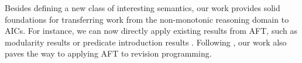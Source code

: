 Besides defining a new class of interesting semantics, our work provides solid foundations for transferring work from the non-monotonic reasoning domain to AICs. For instance, we can now directly apply existing results from AFT, such as modularity results \cite{tocl/VennekensGD06,tocl/BogaertsVD16} or predicate introduction results \cite{VennekensMWD07a,VennekensMWD07b}. 
Following \citet{tplp/CaropreseT11}, our work also paves the way to applying AFT to revision programming. 

% 
%  


